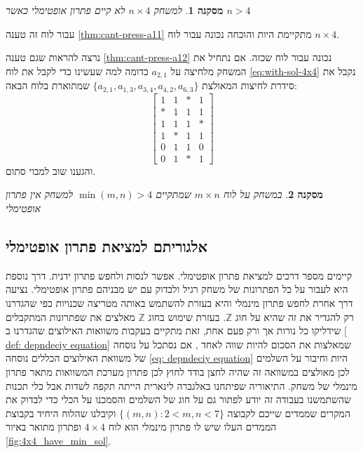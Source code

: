 \documentclass[12pt,leqno]{article}
\theoremstyle{theoremdd}
\newtheorem{corollary}{מסקנה}[section]
\begin{document}
\begin{corollary}
    למשחק 
    $ n \times 4$
    לא קיים פתרון אופטימלי
    כאשר 
    $n > 4$
\end{corollary}
עבור לוח זה
טענה
\ref{thm:cant-press-a11}
מתקיימת היות והוכחה נכונה עבור לוח 
$ n \times 4$. 

נרצה להראות שגם טענה 
\ref{thm:cant-press-a12}
נכונה עבור לוח שכזה.
אם 
נתחיל את המשחק 
מלחיצה על 
$a_{2,1}$
כדומה למה שעשינו כדי לקבל את לוח 
\ref{eq:with-sol-4x4}
נקבל את סידרת לחיצות המאולצת
$\{a_{2,1}, a_{1,3}, a_{3,4}, a_{4,2}, a_{6,3}\}$
שמתוארת בלוח הבאה:
\[
    \begin{bmatrix}
        1 & 1 & * & 1\\
        * & 1 & 1 & 1\\
        1 & 1 & 1 & *\\
        1 & * & 1 & 1\\
        0 & 1 & 1 & 0\\
        0 & 1 & * & 1
    \end{bmatrix}
\]
והגענו שוב למבוי סתום.
\begin{corollary}
    \label{thrm: bigger then 7x7 board no minimal solution}
    במשחק על לוח 
    $m \times n$
    שמתקיים
    $\min(m,n) > 4$
    למשחק אין פתרון אופטימלי
\end{corollary}

\subsection{אלגוריתם למציאת פתרון אופטימלי}
קיימים מספר דרכים למציאת פתרון אופטימלי.
אפשר לנסות ולחפש פתרון ידנית.
דרך נוספת היא לעבור על כל הפתרונות של משחק רגיל ולבדוק עם יש מבניהם פתרון 
אופטימלי.
נציעה דרך אחרת לחפש פתרון 
מינמלי
והיא בעזרת להשתמש באותה מטריצה שכנויות כפי שהגדרנו רק להגדיר 
את זה שהיא על חוג 
$\mathbb{Z}$.
בעזרת שימוש בחוג 
$\mathbb{Z}$
מאלצים את שפתרונות המתקבלים
שידליקו כל נורות אך ורק פעם אחת,
זאת מתקיים בעקבות 
משוואות האילוצים שהגדרנו ב
\ref{ def: depndeciy equation}
שמאלצות את הסכום להיות שווה לאחד
,
אם נסתכל על נוסחה של משוואת האילוצים הכללים 
נוסחה
\ref{eq: depndeciy equation}
היות וחיבור על השלמים לכן 
מאולצים במשוואה זה שהיה לחצן בודד לחוץ 
לכן פתרון מערכת המשוואות מתאר פתרון 
מינמלי של משחק.
התיאוריה שפיתחנו באלגברה לינארית הייתה תקפה לשדות 
אבל כלי תכנות שהשתמשנו
בעבודה זה יודע לפתור גם על חוג של השלמים 
והסמכנו על הכלי כדי לבדוק את המקרים
שממדים שייכם לקבוצה 
$\{ (m,n) : 2 < m,n <7 \}$
וקיבלנו שהלוח
היחיד בקבוצת הממדים העלו שיש לו פתרון מינמלי 
הוא
לוח 
$4 \times 4$
ופתרון מתואר באיור 
\ref{fig:4x4_have_min_sol}.
\end{document}
